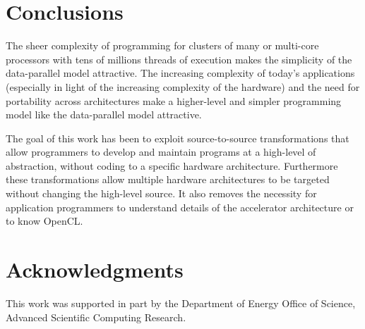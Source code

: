 \documentclass{doublecol-new}
\begin{document}





\maketitle






%


\section{Conclusions}

The sheer complexity of programming for clusters of many or multi-core
processors with tens of millions threads of execution makes the simplicity of
the data-parallel model attractive.  The increasing complexity of
today's applications (especially in light of the increasing complexity
of the hardware) and the need for portability across architectures
make a higher-level and simpler programming model like the data-parallel
model attractive.

The goal of this work has been to exploit source-to-source transformations that
allow programmers to develop and maintain programs at a high-level of
abstraction, without coding to a specific hardware architecture.
Furthermore these transformations allow multiple hardware architectures
to be targeted without changing the high-level source.  It also removes the
necessity for application programmers to understand details of the accelerator
architecture or to know OpenCL.

\section{Acknowledgments}
This work was supported in part by the Department of Energy Office of Science,
Advanced Scientific Computing Research.


%
\newcommand{\newblock}{}


\end{document}
